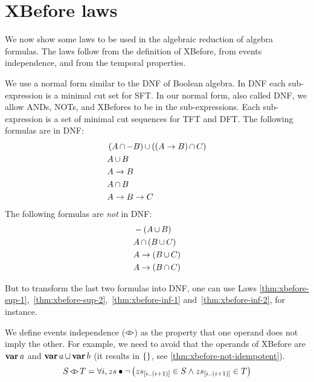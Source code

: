 \documentclass[12pt,openright,twoside,a4paper,oldfontcommands,english,brazil,final]{abntex2}
\theoremstyle{theo}
\newcommand{\slice}[3]{\ensuremath #1_{\left[#2..#3\right]}}
\def\varop{\ensuremath\operatorname{\mathbf{var}}}
\newcommand{\var}[1]{\ensuremath\varop #1}
\def\xbeforeop{\ensuremath\rightarrow}
\newcommand{\xbefore}[2]{\ensuremath #1 \xbeforeop #2 }
\def\independenteventsop{\ensuremath\operatorname{\triangleleft\triangleright}}
\newcommand{\independentevents}[2]{\ensuremath #1 \independenteventsop #2}
\def\False{\ensuremath\operatorname{\left\{\right\}}}
\newcommand{\parsin}[1]{\ensuremath\left( #1 \right)}
\def\union{\ensuremath\operatorname{\cup}}
\def\inter{\ensuremath\operatorname{\cap}}
\begin{document}
\section{\acs*{XBefore} laws}
\label{sec:xbefore-laws}

We now show some laws to be used in the algebraic reduction of \ac{algebra} formulas.
The laws follow from the definition of \ac{XBefore}, from events independence, and from the temporal properties.

We use a normal form similar to the \ac{DNF} of Boolean algebra.
In \ac{DNF} each sub-expression is a minimal cut set for \ac{SFT}.
In our normal form, also called \ac{DNF}, we allow \acp{AND}, \acp{NOT}, and \acp{XBefore} to be in the sub-expressions.
Each sub-expression is a set of minimal cut sequences for \ac{TFT} and \ac{DFT}.
The following formulas are in \ac{DNF}:
%
\begin{align*}
&\parsin{A \inter -B} \union \parsin{\parsin{\xbefore{A}{B}} \inter C}\\
&A \union B\\
&\xbefore{A}{B}\\
&A \inter B\\
&\xbefore{\xbefore{A}{B}}{C}
\end{align*}
%
The following formulas are \emph{not} in \ac{DNF}:
%
\begin{align*}
&-\parsin{A \union B}\\
&A \inter \parsin{B \union C}\\
&\xbefore{A}{\parsin{B \union C}}\\
&\xbefore{A}{\parsin{B \inter C}}
\end{align*}

\begin{sloppypar}
But to transform the last two formulas into \ac{DNF}, one can use Laws \eqref{thm:xbefore-sup-1},~\eqref{thm:xbefore-sup-2},~\eqref{thm:xbefore-inf-1} and~\eqref{thm:xbefore-inf-2}, for instance.
\end{sloppypar}

We define events independence ($\independenteventsop$) as the property that one operand does not imply the other.
For example, we need to avoid that the operands of \ac{XBefore} are $\var{a}$ and $\var{a} \union \var{b}$ (it results in $\False$, see \eqref{thm:xbefore-not-idempotent}).
%
\begin{equation}
\label{law:independent-events}
\independentevents{S}{T} = \forall i, zs \bullet
  \lnot \left(
    \slice{zs}{i}{\left(i+1\right)} \in S \land
    \slice{zs}{i}{\left(i+1\right)} \in T
  \right)
\end{equation}
\end{document}
